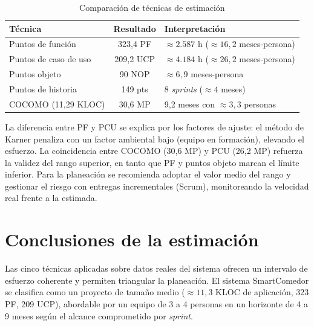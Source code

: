 \begin{table}[H]\centering
\caption{Comparación de técnicas de estimación}\label{tab:est-comp}
\begin{tabularx}{\textwidth}{X c X}
\toprule
\textbf{Técnica} & \textbf{Resultado} & \textbf{Interpretación} \\
\midrule
Puntos de función & 323,4 PF & $\approx 2.587$ h ($\approx 16{,}2$ meses-persona) \\
Puntos de caso de uso & 209,2 UCP & $\approx 4.184$ h ($\approx 26{,}2$ meses-persona) \\
Puntos objeto & 90 NOP & $\approx 6{,}9$ meses-persona \\
Puntos de historia & 149 pts & 8 \emph{sprints} ($\approx 4$ meses) \\
COCOMO (11,29 KLOC) & 30,6 MP & 9,2 meses con $\approx 3{,}3$ personas \\
\bottomrule
\end{tabularx}
\end{table}

La diferencia entre PF y PCU se explica por los factores de ajuste: el método de
Karner penaliza con un factor ambiental bajo (equipo en formación), elevando el esfuerzo.
La coincidencia entre COCOMO (30,6 MP) y PCU (26,2 MP) refuerza la validez del rango
superior, en tanto que PF y puntos objeto marcan el límite inferior. Para la planeación
se recomienda adoptar el valor medio del rango y gestionar el riesgo con entregas
incrementales (Scrum), monitoreando la velocidad real frente a la estimada.

\section{Conclusiones de la estimación}
Las cinco técnicas aplicadas sobre datos reales del sistema ofrecen un intervalo de
esfuerzo coherente y permiten triangular la planeación. El sistema SmartComedor se
clasifica como un proyecto de tamaño medio ($\approx 11{,}3$ KLOC de aplicación,
323 PF, 209 UCP), abordable por un equipo de 3 a 4 personas en un horizonte de
4 a 9 meses según el alcance comprometido por \emph{sprint}.
